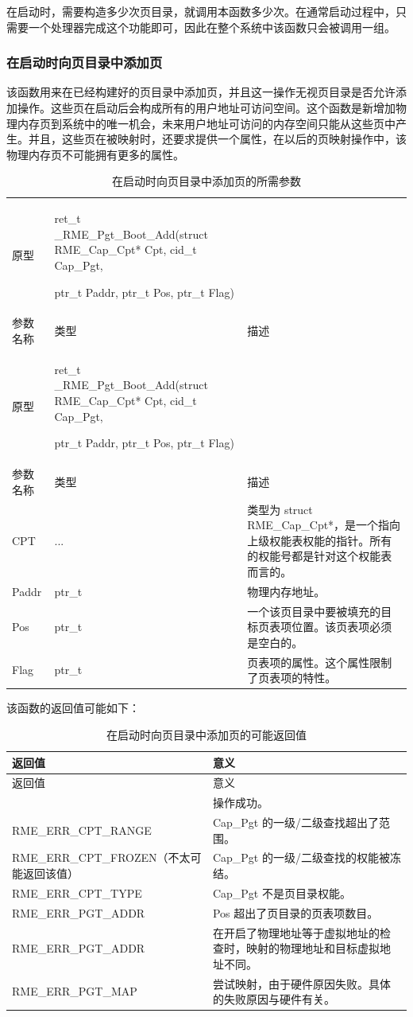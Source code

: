 在启动时，需要构造多少次页目录，就调用本函数多少次。在通常启动过程中，只需要一个处理器完成这个功能即可，因此在整个系统中该函数只会被调用一组。

\subsubsection{在启动时向页目录中添加页}\label{subsubsec:7-add-page-to-page-directory-at-boot}

该函数用来在已经构建好的页目录中添加页，并且这一操作无视页目录是否允许添加操作。这些页在启动后会构成所有的用户地址可访问空间。这个函数是新增加物理内存页到系统中的唯一机会，未来用户地址可访问的内存空间只能从这些页中产生。并且，这些页在被映射时，还要求提供一个属性，在以后的页映射操作中，该物理内存页不可能拥有更多的属性。

\begin{xltabular}{\textwidth}{@{}>{\hsize\raggedright\arraybackslash}X>{\hsize\raggedright\arraybackslash}X>{\hsize\raggedright\arraybackslash}X@{}}
\caption{在启动时向页目录中添加页的所需参数}\label{tab:7-49-add-page-to-page-directory-at-boot-parameters}\\
\toprule
原型\strut
 & ret\_t \_RME\_Pgt\_Boot\_Add(struct RME\_Cap\_Cpt* Cpt, cid\_t Cap\_Pgt,

ptr\_t Paddr, ptr\_t Pos, ptr\_t Flag)\strut
 & \strut
\tabularnewline
参数名称 & 类型 & 描述\tabularnewline
\endfirsthead
\toprule
原型\strut
 & ret\_t \_RME\_Pgt\_Boot\_Add(struct RME\_Cap\_Cpt* Cpt, cid\_t Cap\_Pgt,

ptr\_t Paddr, ptr\_t Pos, ptr\_t Flag)\strut
 & \strut
\tabularnewline
参数名称 & 类型 & 描述\tabularnewline
\midrule
\endhead
\bottomrule
\endlastfoot
CPT & ... &
类型为 struct RME\_Cap\_Cpt*，是一个指向上级权能表权能的指针。所有的权能号都是针对这个权能表而言的。\tabularnewline
Paddr & ptr\_t & 物理内存地址。\tabularnewline
Pos & ptr\_t &
一个该页目录中要被填充的目标页表项位置。该页表项必须是空白的。\tabularnewline
Flag & ptr\_t &
页表项的属性。这个属性限制了页表项的特性。\tabularnewline
\end{xltabular}

该函数的返回值可能如下：

\begin{xltabular}{\textwidth}{@{}>{\hsize\raggedright\arraybackslash}X>{\hsize\raggedright\arraybackslash}X@{}}
\caption{在启动时向页目录中添加页的可能返回值}\label{tab:7-50-add-page-to-page-directory-at-boot-return-values}\\
\toprule
返回值 & 意义\tabularnewline
\endfirsthead
\toprule
返回值 & 意义\tabularnewline
\midrule
\endhead
\bottomrule
{} & 操作成功。\tabularnewline
    RME\_ERR\_CPT\_RANGE & Cap\_Pgt 的一级/二级查找超出了范围。\tabularnewline
    RME\_ERR\_CPT\_FROZEN（不太可能返回该值） & Cap\_Pgt 的一级/二级查找的权能被冻结。\tabularnewline
    RME\_ERR\_CPT\_TYPE & Cap\_Pgt 不是页目录权能。\tabularnewline
    RME\_ERR\_PGT\_ADDR & Pos 超出了页目录的页表项数目。\tabularnewline
    RME\_ERR\_PGT\_ADDR & 在开启了物理地址等于虚拟地址的检查时，映射的物理地址和目标虚拟地址不同。\tabularnewline
    RME\_ERR\_PGT\_MAP & 尝试映射，由于硬件原因失败。具体的失败原因与硬件有关。\tabularnewline
\end{xltabular}

